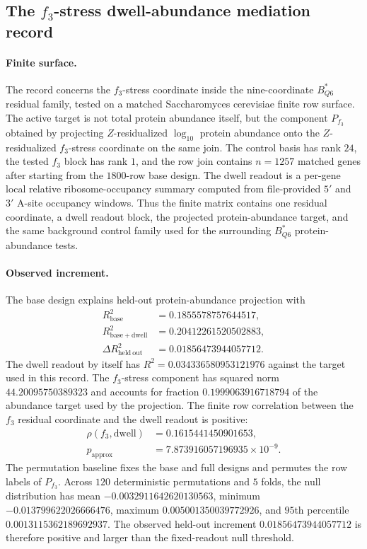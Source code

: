 \subsection{The $f_3$-stress dwell-abundance mediation record}
\label{sec:bioreality-f3-stress-dwell-abundance-powered}

\paragraph{Finite surface.}
The record concerns the $f_3$-stress coordinate inside the nine-coordinate $B^*_{Q6}$ residual family, tested on a matched Saccharomyces cerevisiae finite row surface.  The active target is not total protein abundance itself, but the component
$P_{f_3}$ obtained by projecting $Z$-residualized $\log_{10}$ protein abundance onto the $Z$-residualized $f_3$-stress coordinate on the same join.  The control basis has rank $24$, the tested $f_3$ block has rank $1$, and the row join contains $n=1257$ matched genes after starting from the $1800$-row base design.  The dwell readout is a per-gene local relative ribosome-occupancy summary computed from file-provided $5'$ and $3'$ A-site occupancy windows.  Thus the finite matrix contains one residual coordinate, a dwell readout block, the projected protein-abundance target, and the same background control family used for the surrounding $B^*_{Q6}$ protein-abundance tests.

\paragraph{Observed increment.}
The base design explains held-out protein-abundance projection with
$$
\begin{aligned}
R^2_{\mathrm{base}} &= 0.1855578757644517,\\
R^2_{\mathrm{base+dwell}} &= 0.20412261520502883,\\
\Delta R^2_{\mathrm{held\ out}} &= 0.01856473944057712.
\end{aligned}
$$
The dwell readout by itself has $R^2=0.034336580953121976$ against the target used in this record.  The $f_3$-stress component has squared norm $44.20095750389323$ and accounts for fraction $0.1999063916718794$ of the abundance target used by the projection.  The finite row correlation between the $f_3$ residual coordinate and the dwell readout is positive:
$$
\begin{aligned}
\rho(f_3,\mathrm{dwell}) &= 0.1615441450901653,\\
p_{\mathrm{approx}} &= 7.873916057196935\times 10^{-9}.
\end{aligned}
$$
The permutation baseline fixes the base and full designs and permutes the row labels of $P_{f_3}$.  Across $120$ deterministic permutations and $5$ folds, the null distribution has mean $-0.0032911642620130563$, minimum $-0.013799622026666476$, maximum $0.005001350039772926$, and $95$th percentile $0.0013115362189692937$.  The observed held-out increment $0.01856473944057712$ is therefore positive and larger than the fixed-readout null threshold.

